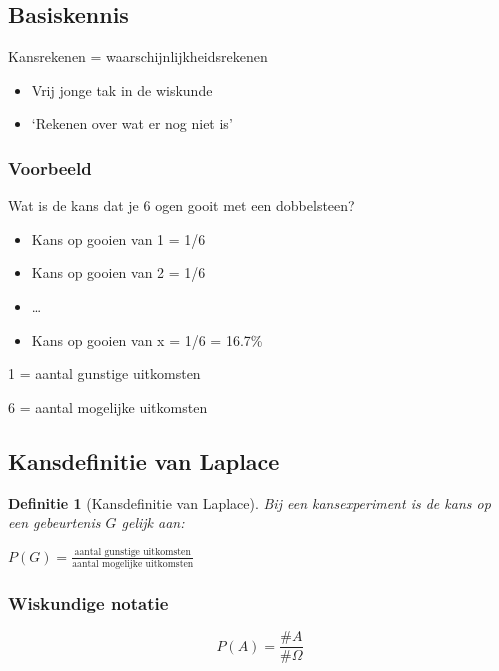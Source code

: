 \documentclass{article}
\newtheorem{theorem}{Definitie}[section]
\begin{document}
\subsection{Basiskennis}

Kansrekenen = waarschijnlijkheidsrekenen

\begin{itemize}
    \item Vrij jonge tak in de wiskunde
    \item `Rekenen over wat er nog niet is'
\end{itemize}

\subsubsection{Voorbeeld}

Wat is de kans dat je 6 ogen gooit met een dobbelsteen?

\begin{itemize}
    \item Kans op gooien van 1 = 1/6
    \item Kans op gooien van 2 = 1/6
    \item \dots
    \item Kans op gooien van x = 1/6 = 16.7\%
\end{itemize}

1 = aantal gunstige uitkomsten

6 = aantal mogelijke uitkomsten

\subsection{Kansdefinitie van Laplace}

\begin{theorem}[Kansdefinitie van Laplace]
Bij een kansexperiment is de kans op een gebeurtenis $G$ gelijk aan:

$P(G) = \frac{\text{aantal gunstige uitkomsten}}{\text{aantal mogelijke uitkomsten}}$

\end{theorem}

\subsubsection{Wiskundige notatie}

\begin{equation}
    P(A) = \frac{\#A}{\#\Omega}
\end{equation}
    
\end{document}
